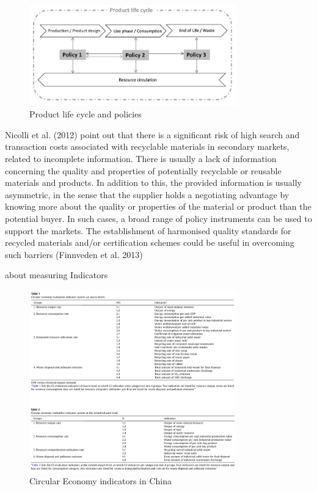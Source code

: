\begin{figure}[h!]
    \centering
    \includegraphics[width=0.8\textwidth]{sections/asset/policies.PNG}
    \caption{Product life cycle and policies}
    \label{fig:ce_policies}
\end{figure}


Nicolli et al. (2012) point out that there is a significant risk of high search and transaction costs associated with recyclable materials in secondary markets, related to incomplete information. There is usually a lack of information concerning the quality and properties of potentially recyclable or reusable materials and products. In addition to this, the provided information is usually asymmetric, in the sense that the supplier holds a negotiating advantage by knowing more about the quality or properties of the material or product than the potential buyer. In such cases, a broad range of policy instruments can be used to support the markets. The establishment of harmonised quality standards for recycled materials and/or certification schemes could be useful in overcoming such barriers (Finnveden et al. 2013)



about measuring Indicators
\parencite{Geng2012}

\begin{figure}[h!]
    \centering
    \includegraphics[width=0.8\textwidth]{sections/asset/ce_china_indicators.PNG}
    \caption{Circular Economy indicators in China}
    \label{fig:ce_chinaindi}
\end{figure}



